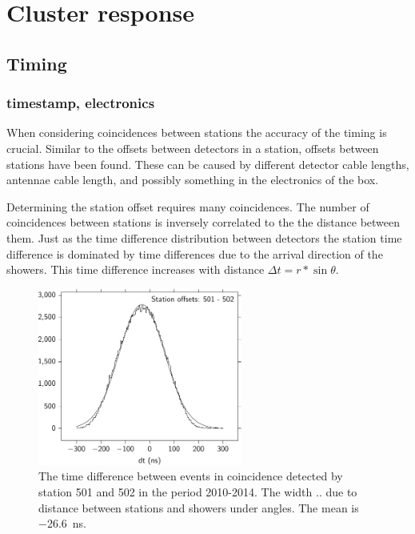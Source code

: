 \chapter{Cluster response}

\section{Timing}

\subsection{\gps timestamp, electronics}

When considering coincidences between stations the accuracy of the
timing is crucial. Similar to the offsets between detectors in a
station, offsets between stations have been found. These can be caused
by different detector cable lengths, \gps antennae cable length, and
possibly something in the electronics of the \hisparc box.

Determining the station offset requires many coincidences. The number of
coincidences between stations is inversely correlated to the the
distance between them. Just as the time difference distribution between
detectors the station time difference is dominated by time differences
due to the arrival direction of the showers. This time difference
increases with distance $\Delta t = r * \sin{\theta}$.

\begin{figure}
    \centering
    \includegraphics[width=0.6\textwidth]{plots/response/station_offsets_501_502.pdf}
    \caption{ The
             time difference between events in coincidence detected by
             station 501 and 502 in the period 2010-2014. The width ..
             due to distance between stations and showers under angles.
             The mean is \SI{-26.6}{\nano\second}.}
    \label{fig:station_offsets_501_502}
\end{figure}

